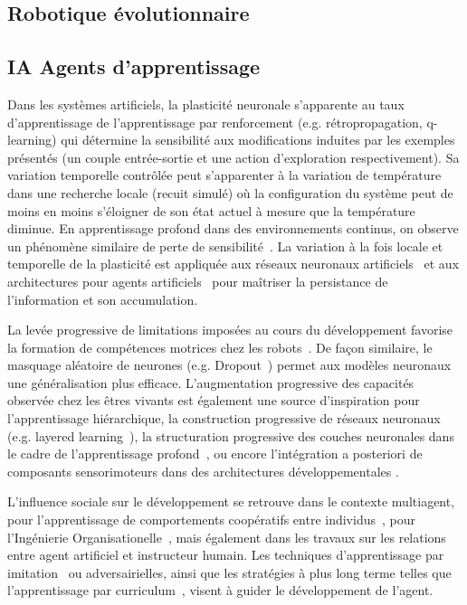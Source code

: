 \subsection{Robotique évolutionnaire}

\subsection{IA Agents d'apprentissage}
Dans les systèmes artificiels, la plasticité neuronale s'apparente au taux d'apprentissage de l'apprentissage par renforcement (e.g. rétropropagation, q-learning) qui détermine la sensibilité aux modifications induites par les exemples présentés (un couple entrée-sortie et une action d'exploration respectivement). Sa variation temporelle contrôlée peut s'apparenter à la variation de température dans une recherche locale (recuit simulé) où la configuration du système peut de moins en moins s'éloigner de son état actuel à mesure que la température diminue. En apprentissage profond dans des environnements continus, on observe un phénomène similaire de perte de sensibilité~\cite{dohare2024loss}. La variation à la fois locale et temporelle de la plasticité est appliquée aux réseaux neuronaux artificiels~\cite{miao2025weight} et aux architectures pour agents artificiels~\cite{dorigo1994robot, suro2021mind} pour maîtriser la persistance de l'information et son accumulation.

La levée progressive de limitations imposées au cours du développement favorise la formation de compétences motrices chez les robots~\cite{lungarella2002interplay}.
De façon similaire, le masquage aléatoire de neurones (e.g. Dropout~\cite{srivastava2014dropout}) permet aux modèles neuronaux une généralisation plus efficace.
L'augmentation progressive des capacités observée chez les êtres vivants est également une source d'inspiration pour l'apprentissage hiérarchique, la construction progressive de réseaux neuronaux (e.g. layered learning~\cite{stone2000layered}), la structuration progressive des couches neuronales dans le cadre de l’apprentissage profond~\cite{lecun2015deep}, ou encore l'intégration a posteriori de composants sensorimoteurs dans des architectures développementales \cite{suro2021mind}.

L'influence sociale sur le développement se retrouve dans le contexte multiagent, pour l'apprentissage de comportements coopératifs entre individus~\cite{suro2020mindmas}, pour l'Ingénierie Organisationelle~\cite{DBLP:conf/jfsma/SouleJOTT24}, mais également dans les travaux sur les relations entre agent artificiel et instructeur humain.
Les techniques d'apprentissage par imitation~\cite{ho2016generative} ou adversairielles, ainsi que les stratégies à plus long terme telles que l'apprentissage par curriculum~\cite{bengio2009curriculum}, visent à guider le développement de l'agent.


